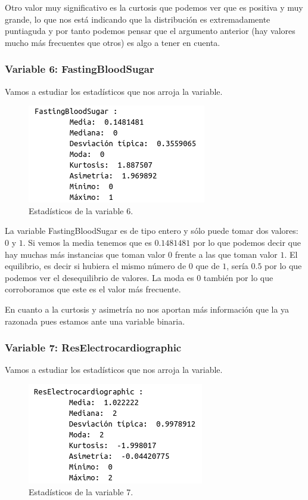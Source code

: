 \documentclass[12pt,a4paper]{article}
\begin{document}
Otro valor muy significativo es la curtosis que podemos ver que es positiva y muy grande, lo que nos está indicando que la distribución es extremadamente puntiaguda y por tanto podemos pensar que el argumento anterior (hay valores mucho más frecuentes que otros) es algo a tener en cuenta.

\subsubsection*{Variable 6: FastingBloodSugar}

Vamos a estudiar los estadísticos que nos arroja la variable.

\begin{figure}[H]
	\centering
	\includegraphics[scale=0.7]{./Imagenes/EDA/Clasificacion/estadisticos_variable6.png}
	\caption{Estadísticos de la variable 6.}
\end{figure}

La variable FastingBloodSugar es de tipo entero y sólo puede tomar dos valores: $0$ y $1$. Si vemos la media tenemos que es $0.1481481$ por lo que podemos decir que hay muchas más instancias que toman valor $0$ frente a las que toman valor $1$. El equilibrio, es decir si hubiera el mismo número de $0$ que de $1$, sería $0.5$ por lo que podemos ver el desequilibrio de valores. La moda es $0$ también por lo que corroboramos que este es el valor más frecuente.

En cuanto a la curtosis y asimetría no nos aportan más información que la ya razonada pues estamos ante una variable binaria.

\subsubsection*{Variable 7: ResElectrocardiographic}

Vamos a estudiar los estadísticos que nos arroja la variable.

\begin{figure}[H]
	\centering
	\includegraphics[scale=0.7]{./Imagenes/EDA/Clasificacion/estadisticos_variable7.png}
	\caption{Estadísticos de la variable 7.}
\end{figure}
\end{document}

